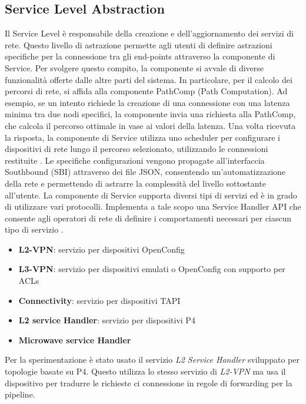 \subsection{Service Level Abstraction}
Il Service Level è responsabile della creazione e dell'aggiornamento dei servizi di rete.
Questo livello di astrazione permette agli utenti di definire astrazioni specifiche per la connessione tra gli end-points attraverso la componente di Service.
\newline Per svolgere questo compito, la componente si avvale di diverse funzionalità offerte dalle altre parti del sistema.
In particolare, per il calcolo dei percorsi di rete, si affida alla componente PathComp (Path Computation).
Ad esempio, se un intento richiede la creazione di una connessione con una latenza minima tra due nodi specifici, 
la componente invia una richiesta alla PathComp, che calcola il percorso ottimale in vase ai valori della latenza.
Una volta ricevuta la risposta, la componente di Service utilizza uno scheduler per configurare i dispositivi di rete lungo il percorso selezionato, utilizzando le connessioni restituite \cite{D32}. %
Le specifiche configurazioni vengono propagate all'interfaccia Southbound (SBI) attraverso dei file JSON, consentendo un'automatizzazione della rete e permettendo di astrarre la complessità del livello sottostante all'utente.
\newline La componente di Service supporta diversi tipi di servizi ed è in grado di utilizzare vari protocolli.
Implementa a tale scopo una Service Handler API che consente agli operatori di rete di definire i comportamenti necessari per ciascun tipo di servizio \cite{D32}.
\begin{itemize}
    \item \textbf{L2-VPN}: servizio per dispositivi OpenConfig
    \item \textbf{L3-VPN}: servizio per dispositivi emulati o OpenConfig con supporto per ACLs
    \item \textbf{Connectivity}: servizio per dispositivi TAPI
    \item \textbf{L2 service Handler}: servizio per dispositivi P4
    \item \textbf{Microwave service Handler}
\end{itemize}
Per la sperimentazione è stato usato il servizio \textit{L2 Service Handler} sviluppato per topologie basate su P4.
Questo utilizza lo stesso servizio di \textit{L2-VPN} ma usa il dispositivo per tradurre le richieste ci connessione in regole di forwarding per la pipeline.
